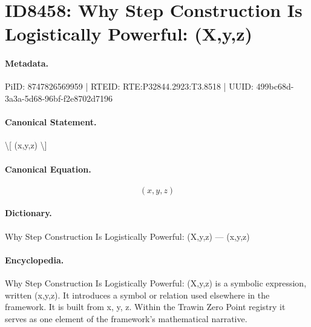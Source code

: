\section*{ID8458: Why Step Construction Is Logistically Powerful: (X,y,z)}
\paragraph{Metadata.}
PiID: 8747826569959 | RTEID: RTE:P32844.2923:T3.8518 | UUID: 499bc68d-3a3a-5d68-96bf-f2e8702d7196

\paragraph{Canonical Statement.}
\textbackslash{}[ (x,y,z) \textbackslash{}]

\paragraph{Canonical Equation.}
\[
(x,y,z)
\]

\paragraph{Dictionary.}
Why Step Construction Is Logistically Powerful: (X,y,z) — (x,y,z)

\paragraph{Encyclopedia.}
Why Step Construction Is Logistically Powerful: (X,y,z) is a symbolic expression, written (x,y,z). It introduces a symbol or relation used elsewhere in the framework. It is built from x, y, z. Within the Trawin Zero Point registry it serves as one element of the framework's mathematical narrative.
